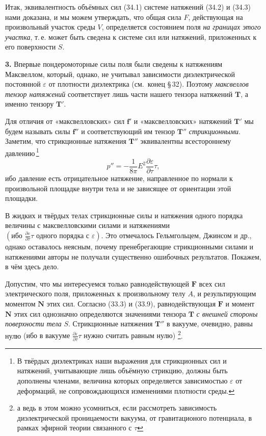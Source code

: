 \documentclass[a4paper,10pt]{article}
\newcommand{\redtext}[1]{\textcolor{redcolor}{#1}}
\begin{document}
Итак, эквивалентность объёмных сил (34.1) системе натяжений (34.2)
и (34.3) нами доказана, и мы можем утверждать, что общая сила $F$,
действующая на произвольный участок среды $V$, определяется состоянием
поля \textit{на границах этого участка}, т.\,е. может быть сведена
к системе сил или натяжений, приложенных к его поверхности $S$.


\textbf{3.} Впервые пондеромоторные силы поля были сведены к натяжениям
Максвеллом, который, однако, не учитывал зависимости диэлектрической
постоянной $\varepsilon$ от плотности диэлектрика (см.\ конец §\,32).
Поэтому \textit{максвеллов тензор натяжений} соответствует лишь части
нашего тензора натяжений $\mathbf{T}$, а именно тензору $\mathbf{T}'$.

Для отличия от «максвелловских» сил $\mathbf{f}'$ и «максвелловских»
натяжений $\mathbf{T}'$ мы будем называть силы $\mathbf{f}''$ и
соответствующий им тензор $\mathbf{T}''$ \textit{стрикционными}.
Заметим, что стрикционные натяжения $\mathbf{T}''$ эквивалентны
всестороннему давлению\,\footnote{В твёрдых диэлектриках наши выражения
для стрикционных сил и натяжений, учитывающие лишь объёмную стрикцию,
должны быть дополнены членами, величина которых определяется
зависимостью $\varepsilon$ от деформаций, не сопровождающихся
изменениями плотности среды.}
\begin{equation}
    p'' = -\frac{1}{8\pi}E^2\frac{\partial\varepsilon}{\partial\tau}\tau,
    \tag{34.4}
\end{equation}
ибо давление есть отрицательное натяжение, направленное по нормали
к произвольной площадке внутри тела и не зависящее от ориентации этой
площадки.

В жидких и твёрдых телах стрикционные силы и натяжения одного порядка
величины с максвелловскими силами и натяжениями
$\left(\text{ибо }\frac{\partial\varepsilon}{\partial\tau}\tau\text{ одного порядка с }\varepsilon\right)$.
Это отмечалось Гельмгольцем, Джинсом и др., однако оставалось неясным,
почему пренебрегающие стрикционными силами и натяжениями авторы не
получали существенно ошибочных результатов. Покажем, в чём здесь дело.

Допустим, что мы интересуемся только равнодействующей $\mathbf{F}$
всех сил электрического поля, приложенных к произвольному телу $A$,
и результирующим моментом $\mathbf{N}$ этих сил. Согласно (33.3)
и (33.9), равнодействующая $\mathbf{F}$ и момент $\mathbf{N}$ этих сил
однозначно определяются значениями тензора $\mathbf{T}$
\textit{с внешней стороны поверхности тела} $S$. Стрикционные натяжения
$\mathbf{T}''$ в вакууме, очевидно, равны нулю \redtext{(ибо в вакууме
$\frac{\partial\varepsilon}{\partial\tau}\tau$ нужно считать равным
нулю)} \footnote{а ведь в этом можно усомниться, если рассмотреть
зависимость диэлектрической проницаемости вакуума, от гравитационого потенциала,
в рамках эфирной теории связанного с $\tau$ }.
\end{document}
